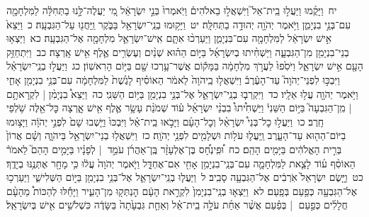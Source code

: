 \documentclass[18pt]{article}
\newcommand{\vart}[1]{\Bfootnote{#1}}	%
\begin{document}
 {\loc יח~}וַיָּקֻ֜מוּ וַיַּעֲל֣וּ בֵֽית־אֵל֮ וַיִּשְׁאֲל֣וּ בֵאלֹהִים֒ וַיֹּֽאמְרוּ֙ בְּנֵ֣י יִשְׂרָאֵ֔ל מִ֚י יַעֲלֶה־לָּ֣נוּ בַתְּחִלָּ֔ה לַמִּלְחָמָ֖ה עִם־בְּנֵ֣י בִנְיָמִ֑ן וַיֹּ֥אמֶר יְהֹוָ֖ה יְהוּדָ֥ה בַתְּחִלָּֽה׃ \startlock
 {\loc יט~}וַיָּק֥וּמוּ בְנֵֽי־יִשְׂרָאֵ֖ל בַּבֹּ֑קֶר וַֽיַּחֲנ֖וּ עַל־הַגִּבְעָֽה׃ \startlock
 {\loc כ~}וַיֵּצֵא֙ אִ֣ישׁ יִשְׂרָאֵ֔ל לַמִּלְחָמָ֖ה עִם־בִּנְיָמִ֑ן וַיַּעַרְכ֨וּ אִתָּ֧ם אִֽישׁ־יִשְׂרָאֵ֛ל מִלְחָמָ֖ה אֶל־הַגִּבְעָֽה׃ \startlock
 {\loc כא~}וַיֵּצְא֥וּ בְנֵי־בִנְיָמִ֖ן מִן־הַגִּבְעָ֑ה וַיַּשְׁחִ֨יתוּ בְיִשְׂרָאֵ֜ל בַּיּ֣וֹם הַה֗וּא שְׁנַ֨יִם וְעֶשְׂרִ֥ים אֶ֛לֶף אִ֖ישׁ אָֽרְצָה׃ \startlock
 {\loc כב~}וַיִּתְחַזֵּ֥ק הָעָ֖ם אִ֣ישׁ יִשְׂרָאֵ֑ל וַיֹּסִ֙פוּ֙ לַעֲרֹ֣ךְ מִלְחָמָ֔ה בַּמָּק֕וֹם אֲשֶׁר־עָ֥רְכוּ שָׁ֖ם בַּיּ֥וֹם הָרִאשֽׁוֹן׃ \startlock
 {\loc כג~}וַיַּעֲל֣וּ בְנֵֽי־יִשְׂרָאֵ֗ל וַיִּבְכּ֣וּ לִפְנֵי־יְהֹוָה֮ עַד־הָעֶ֒רֶב֒ וַיִּשְׁאֲל֤וּ בַֽיהֹוָה֙ לֵאמֹ֔ר הַאוֹסִ֗יף לָגֶ֙שֶׁת֙ לַמִּלְחָמָ֔ה עִם־בְּנֵ֥י בִנְיָמִ֖ן אָחִ֑י וַיֹּ֥אמֶר יְהֹוָ֖ה עֲל֥וּ אֵלָֽיו׃ \startlock
 {\loc כד~}וַיִּקְרְב֧וּ בְנֵֽי־יִשְׂרָאֵ֛ל אֶל־בְּנֵ֥י בִנְיָמִ֖ן בַּיּ֥וֹם הַשֵּׁנִֽי׃ \startlock
 {\loc כה~}וַיֵּצֵא֩ בִנְיָמִ֨ן  |  לִקְרָאתָ֥ם  |  מִֽן־הַגִּבְעָה֮ בַּיּ֣וֹם הַשֵּׁנִי֒ וַיַּשְׁחִ֩יתוּ֩ בִבְנֵ֨י יִשְׂרָאֵ֜ל ע֗וֹד שְׁמֹנַ֨ת עָשָׂ֥ר אֶ֛לֶף אִ֖ישׁ אָ֑רְצָה כׇּל־אֵ֖לֶּה שֹׁ֥לְפֵי חָֽרֶב׃ \startlock
 {\loc כו~}וַיַּעֲל֣וּ כׇל־בְּנֵי֩ יִשְׂרָאֵ֨ל וְכׇל־הָעָ֜ם וַיָּבֹ֣אוּ בֵֽית־אֵ֗ל וַיִּבְכּוּ֙ וַיֵּ֤שְׁבוּ שָׁם֙ לִפְנֵ֣י יְהֹוָ֔ה וַיָּצ֥וּמוּ בַיּוֹם־הַה֖וּא עַד־הָעָ֑רֶב וַֽיַּעֲל֛וּ עֹל֥וֹת וּשְׁלָמִ֖ים לִפְנֵ֥י יְהֹוָֽה׃ \startlock
 {\loc כז~}וַיִּשְׁאֲל֥וּ בְנֵי־יִשְׂרָאֵ֖ל בַּיהֹוָ֑ה וְשָׁ֗ם אֲרוֹן֙ בְּרִ֣ית הָאֱלֹהִ֔ים בַּיָּמִ֖ים הָהֵֽם׃ \startlock
 {\loc כח~}וּ֠פִֽינְחָ֠ס בֶּן־אֶלְעָזָ֨ר בֶּֽן־אַהֲרֹ֜ן עֹמֵ֣ד  |  לְפָנָ֗יו בַּיָּמִ֣ים הָהֵם֮ לֵאמֹר֒ הַאוֹסִ֨ף ע֜וֹד לָצֵ֧את לַמִּלְחָמָ֛ה עִם־בְּנֵֽי־בִנְיָמִ֥ן אָחִ֖י אִם־אֶחְדָּ֑ל וַיֹּ֤אמֶר יְהֹוָה֙ עֲל֔וּ כִּ֥י מָחָ֖ר אֶתְּנֶ֥נּוּ בְיָדֶֽךָ׃ \startlock
 {\loc כט~}וַיָּ֤שֶׂם יִשְׂרָאֵל֙ אֹֽרְבִ֔ים אֶל־הַגִּבְעָ֖ה סָבִֽיב׃ \startlock
 {\loc ל~}וַיַּעֲל֧וּ בְנֵֽי־יִשְׂרָאֵ֛ל אֶל־בְּנֵ֥י בִנְיָמִ֖ן בַּיּ֣וֹם הַשְּׁלִישִׁ֑י וַיַּעַרְכ֥וּ אֶל־הַגִּבְעָ֖ה כְּפַ֥עַם בְּפָֽעַם׃ \startlock
 {\loc לא~}וַיֵּצְא֤וּ בְנֵֽי־בִנְיָמִן֙ לִקְרַ֣את הָעָ֔ם הׇנְתְּק֖וּ מִן־הָעִ֑יר וַיָּחֵ֡לּוּ לְהַכּוֹת֩ מֵהָעָ֨ם חֲלָלִ֜ים כְּפַ֣עַם  |  בְּפַ֗עַם  \edtext{בַּֽמְסִלּוֹת֙}{\vart{א=בַּֽמֲסִלּוֹת֙ | }}  אֲשֶׁ֨ר אַחַ֜ת עֹלָ֣ה בֵֽית־אֵ֗ל וְאַחַ֤ת גִּבְעָ֙תָה֙ בַּשָּׂדֶ֔ה כִּשְׁלֹשִׁ֥ים אִ֖ישׁ בְּיִשְׂרָאֵֽל׃ \startlock
\end{document}
